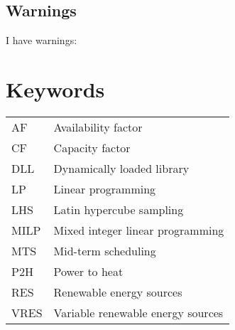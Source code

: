 \newpage

\tableofcontents

\subsection*{Warnings}

I have  warnings:
\begin{itemize}
    \mylistwarnings{\item}
\end{itemize}

\newpage

\section*{Keywords}


\begin{table}[h!]
    \begin{tabular}{p{3cm} p{8cm}}
        AF & Availability factor \\
        CF & Capacity factor \\
        DLL & Dynamically loaded library \\
        LP & Linear programming \\
        LHS & Latin hypercube sampling \\
        MILP & Mixed integer linear programming \\
        MTS & Mid-term scheduling \\
        P2H & Power to heat \\
        RES & Renewable energy sources \\
        VRES & Variable renewable energy sources \\
    \end{tabular}
\end{table}

\newpage
